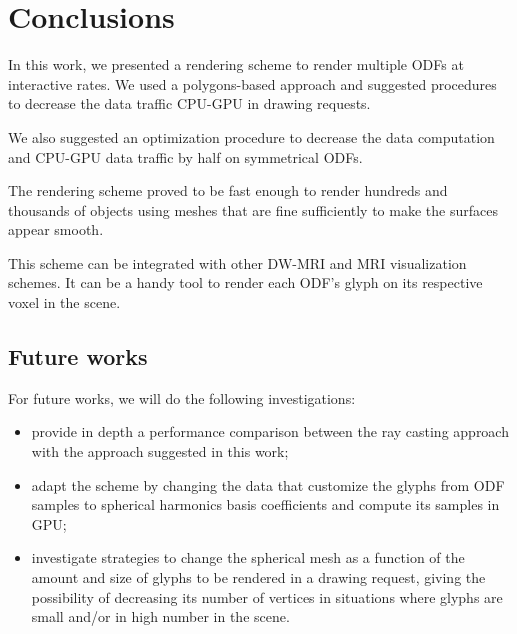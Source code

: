 \documentclass[twoside,twocolumn,10pt]{article}
\begin{document}
\section{Conclusions}
\label{sec::conclusions}

In this work, we presented a rendering scheme to render multiple ODFs at interactive rates. We used a polygons-based approach and suggested procedures to decrease the data traffic CPU-GPU in drawing requests.

We also suggested an optimization procedure to decrease the data computation and CPU-GPU data traffic by half on symmetrical ODFs.

The rendering scheme proved to be fast enough to render hundreds and thousands of objects using meshes that are fine sufficiently to make the surfaces appear smooth.

This scheme can be integrated with other DW-MRI and MRI visualization schemes. It can be a handy tool to render each ODF's glyph on its respective voxel in the scene.

\subsection{Future works}

For future works, we will do the following investigations:
\begin{itemize}
\item provide in depth a performance comparison between the ray casting approach with the approach suggested in this work;
\item adapt the scheme by changing the data that customize the glyphs from ODF samples to spherical harmonics basis coefficients and compute its samples in GPU;
\item investigate strategies to change the spherical mesh as a function of the amount and size of glyphs to be rendered in a drawing request, giving the possibility of decreasing its number of vertices in situations where glyphs are small and/or in high number in the scene.
\end{itemize}







\end{document}
